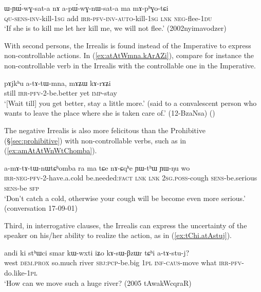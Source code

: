\begin{exe}
\ex \label{ex:apWGnWsata}
\gll ɯ-ɲɯ́-wɣ-sat-a nɤ a-pɯ́-wɣ-nɯ-sat-a ma mɤ-pʰɣo-tɕi \\
\textsc{qu}-\textsc{sens}-\textsc{inv}-kill-\textsc{1sg} add \textsc{irr}-\textsc{pfv}-\textsc{inv}-\textsc{auto}-kill-\textsc{1sg} \textsc{lnk} \textsc{neg}-flee-\textsc{1du} \\
\glt `If she is to kill me let her kill me, we will not flee.' (2002nyimavodzer)
\end{exe}

With second persons, the Irrealis is found instead of the Imperative to express non-controllable actions. In (\ref{ex:atAtWmna.kArAZi}), compare for instance the non-controllable verb  in the Irrealis with the controllable one  in the Imperative.

\begin{exe}
\ex \label{ex:atAtWmna.kArAZi}
\gll pɤjkʰu a-tɤ-tɯ-mna, mɤʑɯ kɤ-rɤʑi \\
still \textsc{irr}-\textsc{pfv}-2-be.better yet \textsc{imp}-stay \\
\glt `[Wait till] you get better, stay a little more.' (said to a convalescent person who wants to leave the place where she is taken care of.'  (12-BzaNsa) ()
\end{exe} 

The negative Irrealis is also more felicitous than the Prohibitive (§\ref{sec:prohibitive}) with non-controllable verbs, such as  in (\ref{ex:amAtAtWnWtChomba}).

\begin{exe}
\ex \label{ex:amAtAtWnWtChomba}
\gll a-mɤ-tɤ-tɯ-nɯtɕʰomba ra ma tɕe nɤ-ɕqʰe ɲɯ-tʰɯ ɲɯ-ŋu wo \\
\textsc{irr}-\textsc{neg}-\textsc{pfv}-2-have.a.cold be.needed:\textsc{fact} \textsc{lnk} \textsc{lnk} \textsc{2sg}.\textsc{poss}-cough \textsc{sens}-be.serious \textsc{sens}-be \textsc{sfp} \\
\glt `Don't catch a cold, otherwise your cough will be become even more serious.' (conversation 17-09-01)
\end{exe}

Third, in interrogative clauses, the Irrealis can express the uncertainty of the speaker on his/her ability to realize the action,  as in (\ref{ex:tChi.atAstuj}).

\begin{exe}
\ex \label{ex:tChi.atAstuj}
\gll andi ki stʰɯci smar kɯ-wxti iʑo kɤ-sɯ-βzɯr tɕʰi a-tɤ-stu-j? \\
west \textsc{dem}.\textsc{prox} so.much river \textsc{sbj}:\textsc{pcp}-be.big \textsc{1pl} \textsc{inf}-\textsc{caus}-move what \textsc{irr}-\textsc{pfv}-do.like-\textsc{1pl} \\
\glt `How can we move such a huge river? (2005 tAwakWcqraR)
\end{exe}

